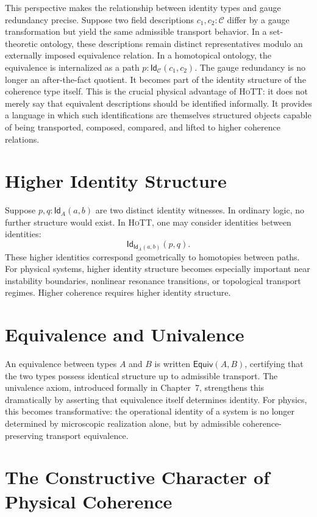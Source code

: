 \documentclass[11pt,openany]{book}
\theoremstyle{definition}
\theoremstyle{plain}
\newcommand{\idtype}{\mathsf{Id}}
\newcommand{\Equiv}{\mathsf{Equiv}}
\newcommand{\HoTT}{\textsc{HoTT}}
\begin{document}
This perspective makes the relationship between identity types and gauge redundancy precise. Suppose two field descriptions $c_1, c_2 : \mathcal{C}$ differ by a gauge transformation but yield the same admissible transport behavior. In a set-theoretic ontology, these descriptions remain distinct representatives modulo an externally imposed equivalence relation. In a homotopical ontology, the equivalence is internalized as a path $p : \idtype_{\mathcal{C}}(c_1,c_2)$. The gauge redundancy is no longer an after-the-fact quotient. It becomes part of the identity structure of the coherence type itself. This is the crucial physical advantage of \HoTT: it does not merely say that equivalent descriptions should be identified informally. It provides a language in which such identifications are themselves structured objects capable of being transported, composed, compared, and lifted to higher coherence relations.

\section{Higher Identity Structure}

Suppose $p,q : \idtype_A(a,b)$ are two distinct identity witnesses. In ordinary logic, no further structure would exist. In \HoTT, one may consider identities between identities:
\[
\idtype_{\idtype_A(a,b)}(p,q).
\]
These higher identities correspond geometrically to homotopies between paths. For physical systems, higher identity structure becomes especially important near instability boundaries, nonlinear resonance transitions, or topological transport regimes. Higher coherence requires higher identity structure.

\section{Equivalence and Univalence}

An equivalence between types $A$ and $B$ is written $\Equiv(A,B)$, certifying that the two types possess identical structure up to admissible transport. The univalence axiom, introduced formally in Chapter~7, strengthens this dramatically by asserting that equivalence itself determines identity. For physics, this becomes transformative: the operational identity of a system is no longer determined by microscopic realization alone, but by admissible coherence-preserving transport equivalence.

\section{The Constructive Character of Physical Coherence}
\end{document}

